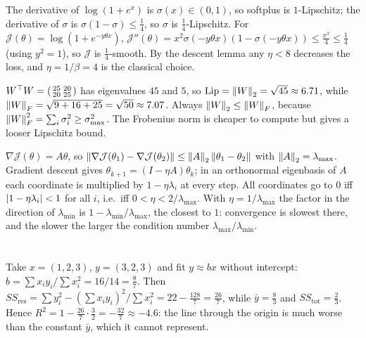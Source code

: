 \section{}

The derivative of $\log(1+e^x)$ is $\sigma(x)\in(0,1)$, so softplus is
$1$-Lipschitz; the derivative of $\sigma$ is $\sigma(1-\sigma)\leq\frac14$, so
$\sigma$ is $\frac14$-Lipschitz. For $\mathcal J(\theta) = \log(1+e^{-y\theta x})$,
$\mathcal J''(\theta) = x^2\sigma(-y\theta x)(1-\sigma(-y\theta x))\leq\frac{x^2}4\leq\frac14$
(using $y^2 = 1$), so $\mathcal J$ is $\frac14$-smooth. By the descent lemma any
$\eta<8$ decreases the loss, and $\eta = 1/\beta = 4$ is the classical choice.

$W^\top W = \begin{psmallmatrix}25&20\\20&25\end{psmallmatrix}$ has eigenvalues
$45$ and $5$, so $\mathrm{Lip} = \left\|W\right\|_2 = \sqrt{45}\approx6.71$, while
$\left\|W\right\|_F = \sqrt{9+16+25} = \sqrt{50}\approx7.07$. Always
$\left\|W\right\|_2\leq\left\|W\right\|_F$, because $\left\|W\right\|_F^2 = \sum_i\sigma_i^2\geq\sigma_{\max}^2$.
The Frobenius norm is cheaper to compute but gives a looser Lipschitz bound.

$\nabla\mathcal J(\theta) = A\theta$, so
$\left\|\nabla\mathcal J(\theta_1) - \nabla\mathcal J(\theta_2)\right\|\leq\left\|A\right\|_2\left\|\theta_1-\theta_2\right\|$
with $\left\|A\right\|_2 = \lambda_{\max}$. Gradient descent gives
$\theta_{k+1} = (I - \eta A)\theta_k$; in an orthonormal eigenbasis of $A$ each
coordinate is multiplied by $1 - \eta\lambda_i$ at every step. All coordinates go
to $0$ iff $\left|1-\eta\lambda_i\right|<1$ for all $i$, i.e.\ iff
$0<\eta<2/\lambda_{\max}$. With $\eta = 1/\lambda_{\max}$ the factor in the
direction of $\lambda_{\min}$ is $1 - \lambda_{\min}/\lambda_{\max}$, the
closest to $1$: convergence is slowest there, and the slower the larger the
condition number $\lambda_{\max}/\lambda_{\min}$.

\section{}

Take $x = (1,2,3)$, $y = (3,2,3)$ and fit $y\approx bx$ without intercept:
$b = \sum x_iy_i/\sum x_i^2 = 16/14 = \frac87$. Then
$SS_{\mathrm{res}} = \sum y_i^2 - (\sum x_iy_i)^2/\sum x_i^2 = 22 - \frac{128}{7} = \frac{26}7$,
while $\bar y = \frac83$ and $SS_{\mathrm{tot}} = \frac23$. Hence
$R^2 = 1 - \frac{26}{7}\cdot\frac32 = -\frac{32}7\approx-4.6$: the line through the
origin is much worse than the constant $\bar y$, which it cannot represent.

